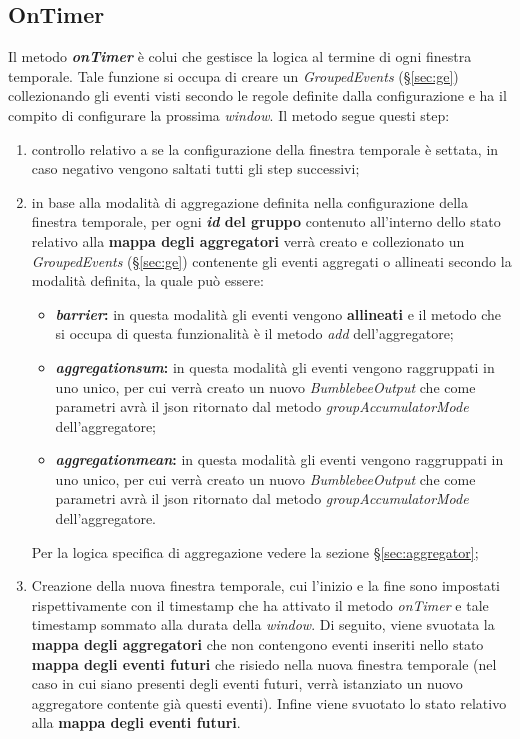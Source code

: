 \subsection{OnTimer}\label{sec:on-timer-windowing}
Il metodo \textbf{\textit{onTimer}} è colui che gestisce la logica al termine di ogni finestra temporale. Tale funzione si occupa di creare un \textit{GroupedEvents} (\S\ref{sec:ge}) collezionando gli eventi visti secondo le regole definite dalla configurazione e ha il compito di configurare la prossima \textit{window}. Il metodo segue questi step:
\begin{enumerate}
	\item{controllo relativo a se la configurazione della finestra temporale è settata, in caso negativo vengono saltati tutti gli step successivi;}
	\item{in base alla modalità di aggregazione definita nella configurazione della finestra temporale, per ogni \textbf{\textit{id} del gruppo} contenuto all'interno dello stato relativo alla \textbf{mappa degli aggregatori} verrà creato e collezionato un \textit{GroupedEvents} (\S\ref{sec:ge}) contenente gli eventi aggregati o allineati secondo la modalità definita, la quale può essere:
	\begin{itemize}
		\item{\textbf{\textit{barrier}:} in questa modalità gli eventi vengono \textbf{allineati} e il metodo che si occupa di questa funzionalità è il metodo \textit{add} dell'aggregatore;}
		\item{\textbf{\textit{aggregation\textunderscore sum}:} in questa modalità gli eventi vengono raggruppati in uno unico, per cui verrà creato un nuovo \textit{BumblebeeOutput} che come parametri avrà il \gls{json} ritornato dal metodo \textit{groupAccumulatorMode} dell'aggregatore;}
		\item{\textbf{\textit{aggregation\textunderscore mean}:} in questa modalità gli eventi vengono raggruppati in uno unico, per cui verrà creato un nuovo \textit{BumblebeeOutput} che come parametri avrà il \gls{json} ritornato dal metodo \textit{groupAccumulatorMode} dell'aggregatore.}
	\end{itemize}
	Per la logica specifica di aggregazione vedere la sezione \S\ref{sec:aggregator};}
	\item{Creazione della nuova finestra temporale, cui l'inizio e la fine sono impostati rispettivamente con il \gls{timestamp} che ha attivato il metodo \textit{onTimer} e tale \gls{timestamp} sommato alla durata della \textit{window}. Di seguito, viene svuotata la \textbf{mappa degli aggregatori} che non contengono eventi inseriti nello stato \textbf{mappa degli eventi futuri} che risiedo nella nuova finestra temporale (nel caso in cui siano presenti degli eventi futuri, verrà istanziato un nuovo aggregatore contente già questi eventi). Infine viene svuotato lo stato relativo alla \textbf{mappa degli eventi futuri}.
	}
\end{enumerate}

